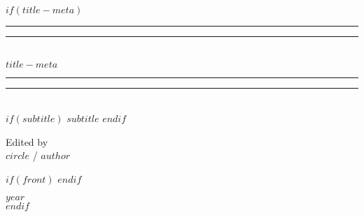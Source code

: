 $if(title-meta)$
\begingroup
{}

\centering %
\vspace*{\baselineskip} %

\rule{\textwidth}{1.6pt}\vspace*{-0.5\baselineskip}\vspace*{2pt} %
\rule{\textwidth}{0.4pt}\\[\baselineskip] %

{\huge $title-meta$} \leavevmode\\[0.2\baselineskip] %

\rule{\textwidth}{0.4pt}\vspace*{-0.5\baselineskip}\vspace{3.2pt} %
\rule{\textwidth}{1.6pt}\\[\baselineskip] %

\scshape %
$if(subtitle)$
{\Large $subtitle$}
$endif$
\vspace*{2\baselineskip} %

{\large Edited by}  \leavevmode\\[\baselineskip]
{\Large $circle$ / $author$} %

$if(front)$
\vfill %
$endif$
\vfill* %

{\scshape }{\large $year$} \\[0.3\baselineskip] %

\thispagestyle{empty}
\blankpage
\restoregeometry
\afterpage{\blankpage}
\endgroup
$endif$
